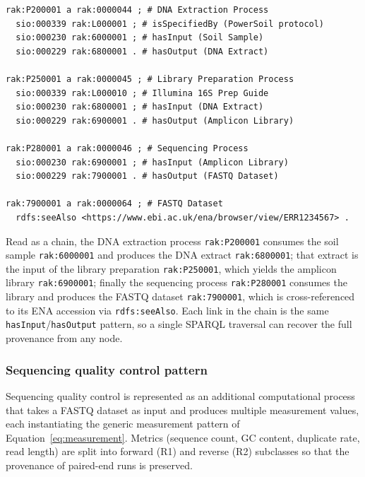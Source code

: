 \documentclass[11pt,a4paper]{article}
\begin{document}
\begin{lstlisting}[caption={Turtle representation of the sequencing
  workflow from soil sample to FASTQ dataset.},
  label={lst:ttl_sequencing}, basicstyle=\ttfamily\scriptsize, frame=single]
rak:P200001 a rak:0000044 ; # DNA Extraction Process
  sio:000339 rak:L000001 ; # isSpecifiedBy (PowerSoil protocol)
  sio:000230 rak:6000001 ; # hasInput (Soil Sample)
  sio:000229 rak:6800001 . # hasOutput (DNA Extract)

rak:P250001 a rak:0000045 ; # Library Preparation Process
  sio:000339 rak:L000010 ; # Illumina 16S Prep Guide
  sio:000230 rak:6800001 ; # hasInput (DNA Extract)
  sio:000229 rak:6900001 . # hasOutput (Amplicon Library)

rak:P280001 a rak:0000046 ; # Sequencing Process
  sio:000230 rak:6900001 ; # hasInput (Amplicon Library)
  sio:000229 rak:7900001 . # hasOutput (FASTQ Dataset)

rak:7900001 a rak:0000064 ; # FASTQ Dataset
  rdfs:seeAlso <https://www.ebi.ac.uk/ena/browser/view/ERR1234567> .
\end{lstlisting}

Read as a chain, the DNA extraction process \texttt{rak:P200001}
consumes the soil sample \texttt{rak:6000001} and produces the DNA
extract \texttt{rak:6800001}; that extract is the input of the library
preparation \texttt{rak:P250001}, which yields the amplicon library
\texttt{rak:6900001}; finally the sequencing process
\texttt{rak:P280001} consumes the library and produces the FASTQ
dataset \texttt{rak:7900001}, which is cross-referenced to its ENA
accession via \texttt{rdfs:seeAlso}. Each link in the chain is the
same \texttt{hasInput}/\texttt{hasOutput} pattern, so a single SPARQL
traversal can recover the full provenance from any node.

\subsubsection{Sequencing quality control pattern}

Sequencing quality control is represented as an additional
computational process that takes a FASTQ dataset as input and
produces multiple measurement values, each instantiating the
generic measurement pattern of Equation~\ref{eq:measurement}.
Metrics (sequence count, GC content, duplicate rate, read length)
are split into forward (R1) and reverse (R2) subclasses so that the
provenance of paired-end runs is preserved.
\end{document}
